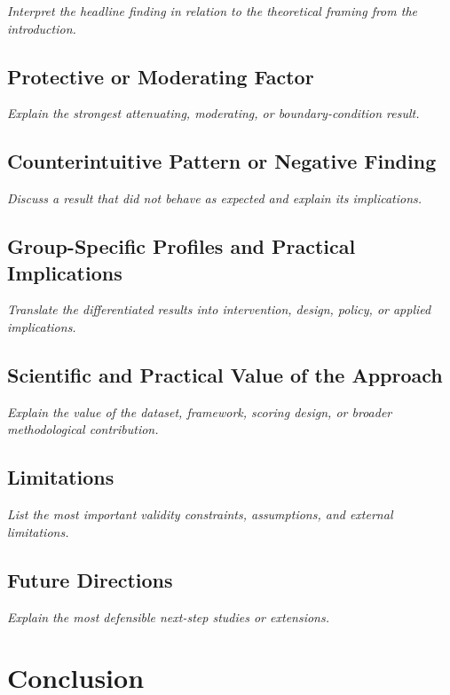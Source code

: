 \documentclass[12pt,a4paper]{article}
\newcommand{\placeholder}[1]{\textit{#1}}
\begin{document}
\placeholder{Interpret the headline finding in relation to the theoretical framing from the introduction.}

\subsection{Protective or Moderating Factor}

\placeholder{Explain the strongest attenuating, moderating, or boundary-condition result.}

\subsection{Counterintuitive Pattern or Negative Finding}

\placeholder{Discuss a result that did not behave as expected and explain its implications.}

\subsection{Group-Specific Profiles and Practical Implications}

\placeholder{Translate the differentiated results into intervention, design, policy, or applied implications.}

\subsection{Scientific and Practical Value of the Approach}

\placeholder{Explain the value of the dataset, framework, scoring design, or broader methodological contribution.}

\subsection{Limitations}

\placeholder{List the most important validity constraints, assumptions, and external limitations.}

\subsection{Future Directions}

\placeholder{Explain the most defensible next-step studies or extensions.}

\section{Conclusion}
\end{document}
